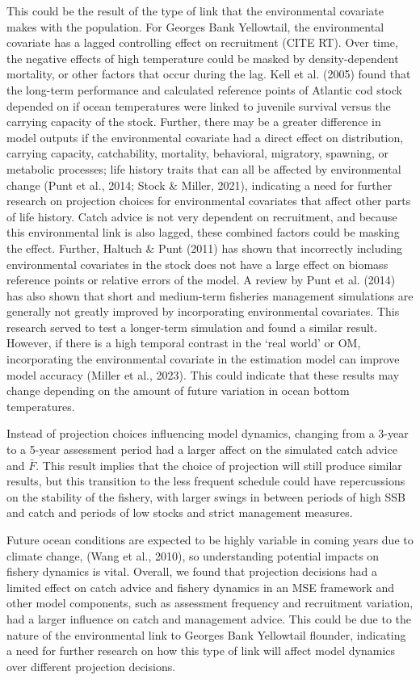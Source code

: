 \documentclass[
  12pt,
]{article}
\begin{document}
This could be the result of the type of link that the environmental covariate makes with the population. For Georges Bank Yellowtail, the environmental covariate has a lagged controlling effect on recruitment (CITE RT). Over time, the negative effects of high temperature could be masked by density-dependent mortality, or other factors that occur during the lag. Kell et al. (2005) found that the long-term performance and calculated reference points of Atlantic cod stock depended on if ocean temperatures were linked to juvenile survival versus the carrying capacity of the stock. Further, there may be a greater difference in model outputs if the environmental covariate had a direct effect on distribution, carrying capacity, catchability, mortality, behavioral, migratory, spawning, or metabolic processes; life history traits that can all be affected by environmental change (Punt et al., 2014; Stock \& Miller, 2021), indicating a need for further research on projection choices for environmental covariates that affect other parts of life history. Catch advice is not very dependent on recruitment, and because this environmental link is also lagged, these combined factors could be masking the effect. Further, Haltuch \& Punt (2011) has shown that incorrectly including environmental covariates in the stock does not have a large effect on biomass reference points or relative errors of the model. A review by Punt et al. (2014) has also shown that short and medium-term fisheries management simulations are generally not greatly improved by incorporating environmental covariates. This research served to test a longer-term simulation and found a similar result. However, if there is a high temporal contrast in the `real world' or OM, incorporating the environmental covariate in the estimation model can improve model accuracy (Miller et al., 2023). This could indicate that these results may change depending on the amount of future variation in ocean bottom temperatures.

Instead of projection choices influencing model dynamics, changing from a 3-year to a 5-year assessment period had a larger affect on the simulated catch advice and \(\bar{F}\). This result implies that the choice of projection will still produce similar results, but this transition to the less frequent schedule could have repercussions on the stability of the fishery, with larger swings in between periods of high SSB and catch and periods of low stocks and strict management measures.

Future ocean conditions are expected to be highly variable in coming years due to climate change, (Wang et al., 2010), so understanding potential impacts on fishery dynamics is vital. Overall, we found that projection decisions had a limited effect on catch advice and fishery dynamics in an MSE framework and other model components, such as assessment frequency and recruitment variation, had a larger influence on catch and management advice. This could be due to the nature of the environmental link to Georges Bank Yellowtail flounder, indicating a need for further research on how this type of link will affect model dynamics over different projection decisions.
\end{document}
